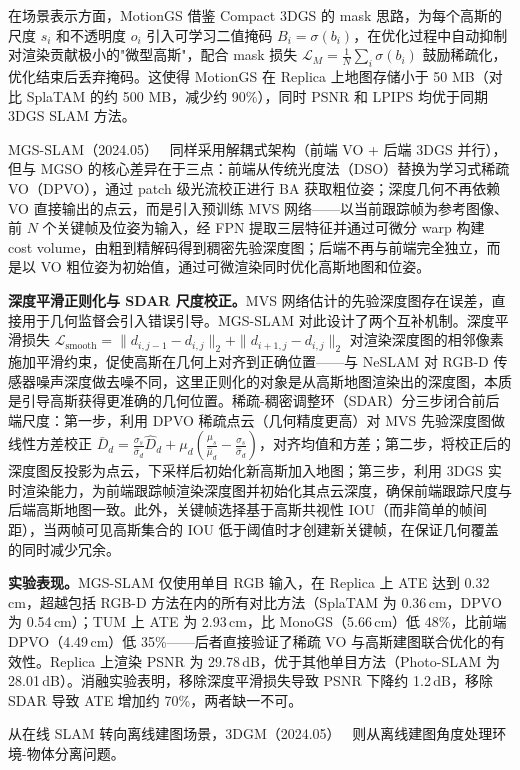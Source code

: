 在场景表示方面，MotionGS 借鉴 Compact 3DGS 的 mask 思路，为每个高斯的尺度 $s_i$ 和不透明度 $o_i$ 引入可学习二值掩码 $B_i = \sigma(b_i)$，在优化过程中自动抑制对渲染贡献极小的"微型高斯"，配合 mask 损失 $\mathcal{L}_M = \frac{1}{N}\sum_{i}\sigma(b_i)$ 鼓励稀疏化，优化结束后丢弃掩码。这使得 MotionGS 在 Replica 上地图存储小于 50 MB（对比 SplaTAM 的约 500 MB，减少约 90\%），同时 PSNR 和 LPIPS 均优于同期 3DGS SLAM 方法。

MGS-SLAM（2024.05）~\cite{2405_06241} 同样采用解耦式架构（前端 VO + 后端 3DGS 并行），但与 MGSO 的核心差异在于三点：前端从传统光度法（DSO）替换为学习式稀疏 VO（DPVO），通过 patch 级光流校正进行 BA 获取粗位姿；深度几何不再依赖 VO 直接输出的点云，而是引入预训练 MVS 网络——以当前跟踪帧为参考图像、前 $N$ 个关键帧及位姿为输入，经 FPN 提取三层特征并通过可微分 warp 构建 cost volume，由粗到精解码得到稠密先验深度图；后端不再与前端完全独立，而是以 VO 粗位姿为初始值，通过可微渲染同时优化高斯地图和位姿。

\textbf{深度平滑正则化与 SDAR 尺度校正。}MVS 网络估计的先验深度图存在误差，直接用于几何监督会引入错误引导。MGS-SLAM 对此设计了两个互补机制。深度平滑损失 $\mathcal{L}_{\mathrm{smooth}} = \|d_{i,j-1}-d_{i,j}\|_2 + \|d_{i+1,j}-d_{i,j}\|_2$ 对渲染深度图的相邻像素施加平滑约束，促使高斯在几何上对齐到正确位置——与 NeSLAM 对 RGB-D 传感器噪声深度做去噪不同，这里正则化的对象是从高斯地图渲染出的深度图，本质是引导高斯获得更准确的几何位置。稀疏-稠密调整环（SDAR）分三步闭合前后端尺度：第一步，利用 DPVO 稀疏点云（几何精度更高）对 MVS 先验深度图做线性方差校正 $\bar{D}_d = \frac{\sigma_s}{\hat{\sigma}_d}\hat{D}_d + \mu_d(\frac{\mu_s}{\hat{\mu}_d}-\frac{\sigma_s}{\hat{\sigma}_d})$，对齐均值和方差；第二步，将校正后的深度图反投影为点云，下采样后初始化新高斯加入地图；第三步，利用 3DGS 实时渲染能力，为前端跟踪帧渲染深度图并初始化其点云深度，确保前端跟踪尺度与后端高斯地图一致。此外，关键帧选择基于高斯共视性 IOU（而非简单的帧间距），当两帧可见高斯集合的 IOU 低于阈值时才创建新关键帧，在保证几何覆盖的同时减少冗余。

\textbf{实验表现。}MGS-SLAM 仅使用单目 RGB 输入，在 Replica 上 ATE 达到 0.32\,cm，超越包括 RGB-D 方法在内的所有对比方法（SplaTAM 为 0.36\,cm，DPVO 为 0.54\,cm）；TUM 上 ATE 为 2.93\,cm，比 MonoGS（5.66\,cm）低 48\%，比前端 DPVO（4.49\,cm）低 35\%——后者直接验证了稀疏 VO 与高斯建图联合优化的有效性。Replica 上渲染 PSNR 为 29.78\,dB，优于其他单目方法（Photo-SLAM 为 28.01\,dB）。消融实验表明，移除深度平滑损失导致 PSNR 下降约 1.2\,dB，移除 SDAR 导致 ATE 增加约 70\%，两者缺一不可。

从在线 SLAM 转向离线建图场景，3DGM（2024.05）~\cite{2405_17187} 则从离线建图角度处理环境-物体分离问题。

